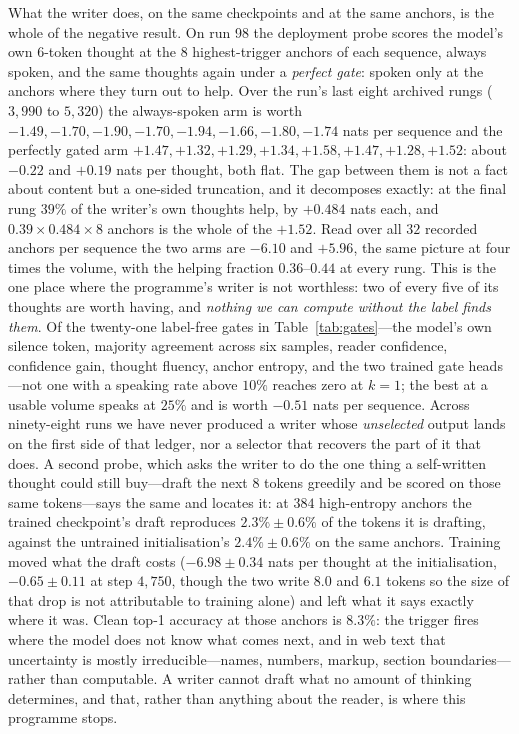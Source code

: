 \documentclass{article} %
\begin{document}
What the writer does, on the same checkpoints and at the same anchors, is the whole of the negative result. On run 98 the deployment probe scores the model's own $6$-token thought at the $8$ highest-trigger anchors of each sequence, always spoken, and the same thoughts again under a \emph{perfect gate}: spoken only at the anchors where they turn out to help. Over the run's last eight archived rungs ($3{,}990$ to $5{,}320$) the always-spoken arm is worth $-1.49, -1.70, -1.90, -1.70, -1.94, -1.66, -1.80, -1.74$ nats per sequence and the perfectly gated arm $+1.47, +1.32, +1.29, +1.34, +1.58, +1.47, +1.28, +1.52$: about $-0.22$ and $+0.19$ nats per thought, both flat. The gap between them is not a fact about content but a one-sided truncation, and it decomposes exactly: at the final rung $39\%$ of the writer's own thoughts help, by $+0.484$ nats each, and $0.39 \times 0.484 \times 8$ anchors is the whole of the $+1.52$. Read over all $32$ recorded anchors per sequence the two arms are $-6.10$ and $+5.96$, the same picture at four times the volume, with the helping fraction $0.36$--$0.44$ at every rung. This is the one place where the programme's writer is not worthless: two of every five of its thoughts are worth having, and \emph{nothing we can compute without the label finds them}. Of the twenty-one label-free gates in Table~\ref{tab:gates}---the model's own silence token, majority agreement across six samples, reader confidence, confidence gain, thought fluency, anchor entropy, and the two trained gate heads---not one with a speaking rate above $10\%$ reaches zero at $k=1$; the best at a usable volume speaks at $25\%$ and is worth $-0.51$ nats per sequence. Across ninety-eight runs we have never produced a writer whose \emph{unselected} output lands on the first side of that ledger, nor a selector that recovers the part of it that does. A second probe, which asks the writer to do the one thing a self-written thought could still buy---draft the next $8$ tokens greedily and be scored on those same tokens---says the same and locates it: at $384$ high-entropy anchors the trained checkpoint's draft reproduces $2.3\% \pm 0.6\%$ of the tokens it is drafting, against the untrained initialisation's $2.4\% \pm 0.6\%$ on the same anchors. Training moved what the draft costs ($-6.98 \pm 0.34$ nats per thought at the initialisation, $-0.65 \pm 0.11$ at step $4{,}750$, though the two write $8.0$ and $6.1$ tokens so the size of that drop is not attributable to training alone) and left what it says exactly where it was. Clean top-1 accuracy at those anchors is $8.3\%$: the trigger fires where the model does not know what comes next, and in web text that uncertainty is mostly irreducible---names, numbers, markup, section boundaries---rather than computable. A writer cannot draft what no amount of thinking determines, and that, rather than anything about the reader, is where this programme stops.
\end{document}

